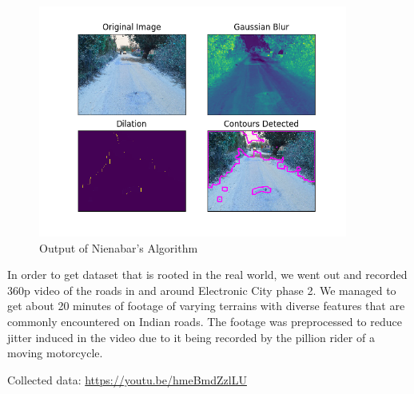 \documentclass[12pt,a4paper]{article}
\begin{document}
\begin{itemize}
    

    \begin{figure}[ht!]
        \centering
        \includegraphics[width = 4in]{images/nienabar_8.png}
        \caption{Output of Nienabar's Algorithm}
    \end{figure}

\end{itemize}

\vspace*{.5cm}

\newpage


In order to get dataset that is rooted in the real world, we went out and recorded 360p video of the roads in and around Electronic City phase 2. We managed to get about 20 minutes of footage of varying terrains with diverse features that are commonly encountered on Indian roads. The footage was preprocessed to reduce jitter induced in the video due to it being recorded by the pillion rider of a moving motorcycle. 

\vspace*{.25cm}

Collected data: \url{ https://youtu.be/hmeBmdZzlLU }

\vspace*{.25cm}
\end{document}
